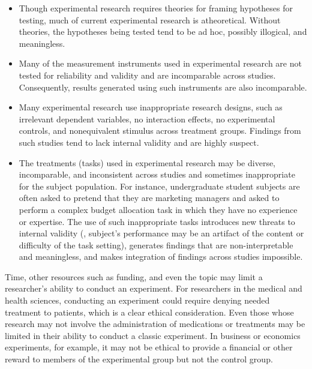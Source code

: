 \begin{itemize}
	\item Though experimental research requires theories for framing hypotheses for testing, much of current experimental research is atheoretical. Without theories, the hypotheses being tested tend to be ad hoc, possibly illogical, and meaningless. 

	\item Many of the measurement instruments used in experimental research are not tested for reliability and validity and are incomparable across studies. Consequently, results generated using such instruments are also incomparable. 

	\item Many experimental research use inappropriate research designs, such as irrelevant dependent variables, no interaction effects, no experimental controls, and nonequivalent stimulus across treatment groups. Findings from such studies tend to lack internal validity and are highly suspect. 

	\item The treatments (tasks) used in experimental research may be diverse, incomparable, and inconsistent across studies and sometimes inappropriate for the subject population. For instance, undergraduate student subjects are often asked to pretend that they are marketing managers and asked to perform a complex budget allocation task in which they have no experience or expertise. The use of such inappropriate tasks introduces new threats to internal validity (\ie, subject's performance may be an artifact of the content or difficulty of the task setting), generates findings that are non-interpretable and meaningless, and makes integration of findings across studies impossible.
\end{itemize}

Time, other resources such as funding, and even the topic may limit a researcher's ability to conduct an experiment. For researchers in the medical and health sciences, conducting an experiment could require denying needed treatment to patients, which is a clear ethical consideration. Even those whose research may not involve the administration of medications or treatments may be limited in their ability to conduct a classic experiment. In business or economics experiments, for example, it may not be ethical to provide a financial or other reward to members of the experimental group but not the control group. 

